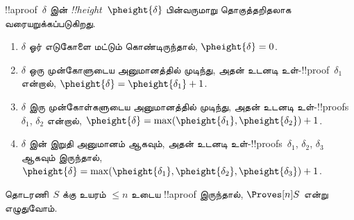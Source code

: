 \documentclass[../../../include/open-logic-section]{subfiles}
\begin{document}


\begin{defn}
!!a{proof}~$\delta$ இன் \emph{!!{height}}~$\pheight{\delta}$
பின்வருமாறு தொகுத்தறிதலாக வரையறுக்கப்படுகிறது.
\begin{enumerate}
  \item $\delta$ ஓர் எடுகோளை மட்டும் கொண்டிருந்தால்,
  $\pheight{\delta} = 0$.
  \item $\delta$ ஒரு முன்கோளுடைய அனுமானத்தில் முடிந்து,
  அதன் உடனடி உள்-!!{proof}~$\delta_1$ என்றால்,
  $\pheight{\delta} = \pheight{\delta_1} + 1$.
  \item $\delta$ இரு முன்கோள்களுடைய அனுமானத்தில் முடிந்து,
  அதன் உடனடி உள்-!!{proof}s~$\delta_1$, $\delta_2$ என்றால்,
  $\pheight{\delta} = \max(\pheight{\delta_1}, \pheight{\delta_2}) + 1$.
  \item $\delta$ இன் இறுதி அனுமானம் \Elim{\lor} ஆகவும்,
  அதன் உடனடி உள்-!!{proof}s~$\delta_1$, $\delta_2$,
  $\delta_3$ ஆகவும் இருந்தால்,
  $\pheight{\delta} = \max(\pheight{\delta_1}, \pheight{\delta_2}, \pheight{\delta_3}) + 1$.
\end{enumerate}
தொடரணி~$S$ க்கு உயரம் $\le n$ உடைய !!a{proof}
இருந்தால், $\Proves[n] S$ என்று எழுதுவோம்.
\end{defn}
\end{document}
